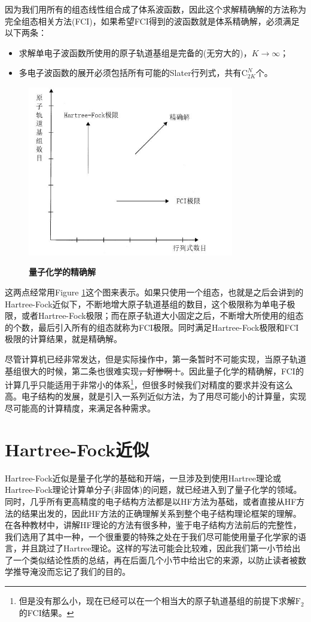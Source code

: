 \documentclass[12pt,a4paper,openany,twoside]{book}
\numberwithin{equation}{section}
\begin{document}
          因为我们用所有的组态线性组合成了体系波函数，因此这个求解精确解的方法称为完全组态相关方法(FCI)，如果希望FCI得到的波函数就是体系精确解，必须满足以下两条：
          \begin{itemize}
            \item 求解单电子波函数所使用的原子轨道基组是完备的(无穷大的)，$K \rightarrow \infty$；
            \item 多电子波函数的展开必须包括所有可能的Slater行列式，共有$\mathrm{C}_{2K}^N$个。
          \end{itemize}
          \begin{figure}
            \centering
            \includegraphics[width = 9cm]{fig/exactsolution.jpg}\\
            \caption{\textbf{量子化学的精确解}}
            \label{exact solution}
          \end{figure}
          
          这两点经常用Figure \ref{exact solution}这个图来表示。如果只使用一个组态，也就是之后会讲到的Hartree-Fock近似下，不断地增大原子轨道基组的数目，这个极限称为单电子极限，或者Hartree-Fock极限；而在原子轨道大小固定之后，不断增大所使用的组态的个数，最后引入所有的组态就称为FCI极限。同时满足Hartree-Fock极限和FCI极限的计算结果，就是精确解。
          
          尽管计算机已经非常发达，但是实际操作中，第一条暂时不可能实现，当原子轨道基组很大的时候，第二条也很难实现\sout{，好惨啊！}。因此量子化学的精确解，FCI的计算几乎只能适用于非常小的体系\footnote{但是没有那么小，现在已经可以在一个相当大的原子轨道基组的前提下求解$\text{F}_2$的FCI结果。}，但很多时候我们对精度的要求并没有这么高。电子结构的发展，就是引入一系列近似方法，为了用尽可能小的计算量，实现尽可能高的计算精度，来满足各种需求。
      \section{Hartree-Fock近似}
        Hartree-Fock近似是量子化学的基础和开端，一旦涉及到使用Hartree理论或Hartree-Fock理论计算单分子(非固体)的问题，就已经进入到了量子化学的领域。同时，几乎所有更高精度的电子结构方法都是以HF方法为基础，或者直接从HF方法的结果出发的，因此HF方法的正确理解关系到整个电子结构理论框架的理解。在各种教材中，讲解HF理论的方法有很多种，鉴于电子结构方法前后的完整性，我们选用了其中一种，一个很重要的特殊之处在于我们尽可能使用量子化学家的语言，并且跳过了Hartree理论。这样的写法可能会比较难，因此我们第一小节给出了一个类似结论性质的总结，再在后面几个小节中给出它的来源，以防止读者被数学推导淹没而忘记了我们的目的。
        
\end{document}
